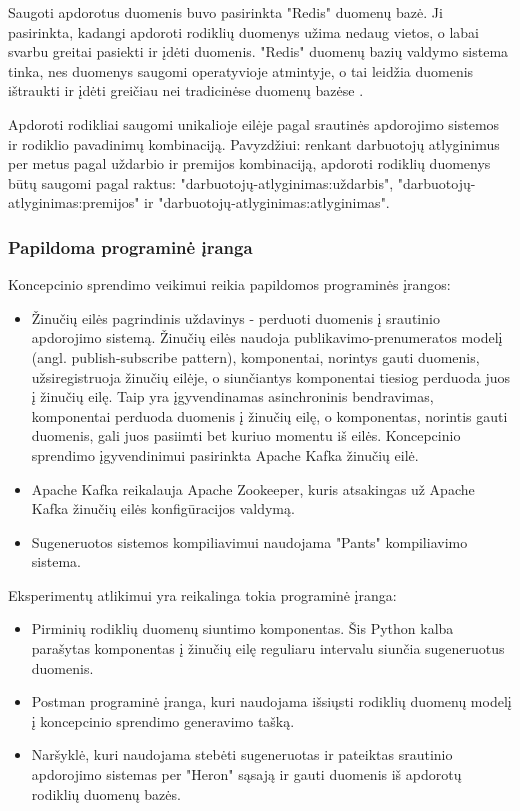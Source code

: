 \documentclass{VUMIFPSbakalaurinis}
\begin{document}
Saugoti apdorotus duomenis buvo pasirinkta "Redis" duomenų bazė. Ji pasirinkta, kadangi apdoroti rodiklių duomenys užima nedaug vietos, o labai svarbu greitai pasiekti ir įdėti duomenis. "Redis" duomenų bazių valdymo sistema tinka, nes duomenys saugomi operatyvioje atmintyje, o tai leidžia duomenis ištraukti ir įdėti greičiau nei tradicinėse duomenų bazėse \cite{carlson2013redis}.\par
Apdoroti rodikliai saugomi unikalioje eilėje pagal srautinės apdorojimo sistemos ir rodiklio pavadinimų kombinaciją. Pavyzdžiui: renkant darbuotojų atlyginimus per metus pagal uždarbio ir premijos kombinaciją, apdoroti rodiklių duomenys būtų saugomi pagal raktus: "darbuotojų-atlyginimas:uždarbis", "darbuotojų-atlyginimas:premijos" ir "darbuotojų-atlyginimas:atlyginimas".

\subsubsection{Papildoma programinė įranga}

Koncepcinio sprendimo veikimui reikia papildomos programinės įrangos:
\begin{itemize}
    \item Žinučių eilės pagrindinis uždavinys - perduoti duomenis į srautinio apdorojimo sistemą. Žinučių eilės naudoja publikavimo-prenumeratos modelį (angl. publish-subscribe pattern), komponentai, norintys gauti duomenis, užsiregistruoja žinučių eilėje, o siunčiantys komponentai tiesiog perduoda juos į žinučių eilę. Taip yra įgyvendinamas asinchroninis bendravimas, komponentai perduoda duomenis į žinučių eilę, o komponentas, norintis gauti duomenis, gali juos pasiimti bet kuriuo momentu iš eilės. Koncepcinio sprendimo įgyvendinimui pasirinkta Apache Kafka žinučių eilė.
    \item Apache Kafka reikalauja Apache Zookeeper, kuris atsakingas už Apache Kafka žinučių eilės konfigūracijos valdymą.
    \item Sugeneruotos sistemos kompiliavimui naudojama "Pants" kompiliavimo sistema.
\end{itemize}
Eksperimentų atlikimui yra reikalinga tokia programinė įranga:
\begin{itemize}
    \item Pirminių rodiklių duomenų siuntimo komponentas. Šis Python kalba parašytas komponentas į žinučių eilę reguliaru intervalu siunčia sugeneruotus duomenis.
    \item Postman programinė įranga, kuri naudojama išsiųsti rodiklių duomenų modelį į koncepcinio sprendimo generavimo tašką.
    \item Naršyklė, kuri naudojama stebėti sugeneruotas ir pateiktas srautinio apdorojimo sistemas per "Heron" sąsają ir gauti duomenis iš apdorotų rodiklių duomenų bazės.
\end{itemize}
\end{document}

